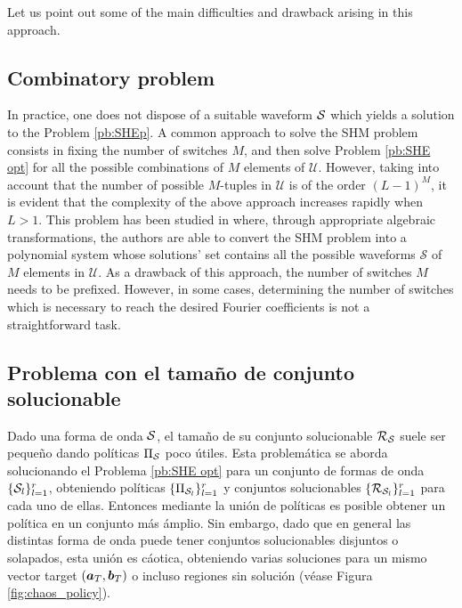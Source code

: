 \documentclass[twocolumn]{autart}    %
\begin{document}
\JOEnd

Let us point out some of the main difficulties and drawback arising in this approach.

\subsection{Combinatory problem}\label{subsec:Combinatory Problem}
In practice, one does not dispose of a suitable waveform $\mathcal{S}$ which yields a solution to the Problem \ref{pb:SHEp}. A common approach to solve the SHM problem consists in fixing the number of switches $M$, and then solve Problem \ref{pb:SHE opt} for  all the possible combinations of $M$ elements of $\mathcal{U}$. However, taking into account that the number of possible $M$-tuples  in $\mathcal U$ is of the order $(L-1)^M$, it is evident that the complexity of the above approach increases rapidly when $L>1$. This problem has been studied in \cite{Yang2015} where, through appropriate algebraic transformations, the authors are able to convert the SHM problem into a polynomial system whose solutions' set contains all the possible waveforms $\mathcal S$ of $M$ elements in $\mathcal{U}$. As a drawback of this approach, the number of switches $M$ needs to be prefixed. However, in some cases,  determining the number of switches which is necessary to reach the desired Fourier coefficients is not a straightforward task.

\JOStart
\subsection{Problema con el tamaño de conjunto solucionable}\label{subsec: resolvable set probem }

Dado una forma de onda $\mathcal{S}$, el tamaño de su conjunto solucionable $\mathcal{R}_{\mathcal{S}}$ suele ser  pequeño dando políticas $\Pi_{\mathcal{S}}$ poco útiles. Esta problemática se aborda solucionando el Problema \ref{pb:SHE opt} para un conjunto de formas de onda $\{\mathcal{S}_l\}_{l=1}^r$, obteniendo políticas $\{\Pi_{\mathcal{S}_l}\}_{l=1}^r$ y  conjuntos solucionables $\{\mathcal{R}_{\mathcal{S}_l}\}_{l=1}^r$ para cada uno de ellas. Entonces mediante la unión de políticas es posible obtener un política en un conjunto más ámplio. Sin embargo, dado que en general las distintas forma de onda puede tener conjuntos solucionables disjuntos o solapados, esta unión es cáotica, obteniendo varias soluciones para un mismo vector target $(\bm{a}_T,\bm{b}_T)$ o incluso regiones sin solución (véase Figura \ref{fig:chaos_policy}).
\end{document}
